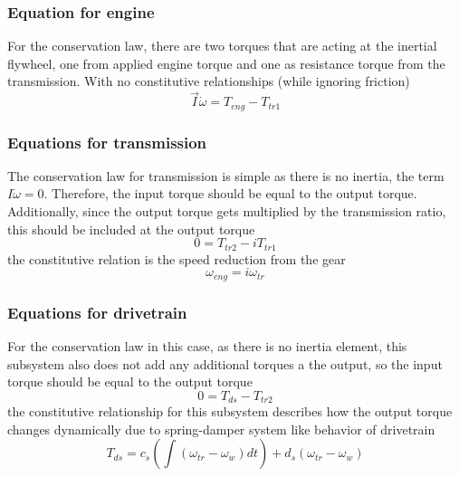 \subsubsection{Equation for engine}
For the conservation law, there are two torques that are acting at the inertial flywheel, one from applied engine torque and one as resistance torque from the transmission. With no constitutive relationships (while ignoring friction)
\begin{equation}
	\vec{I}\dot{\omega} = T_{eng} - T_{tr1}
\end{equation}

\subsubsection{Equations for transmission}

The conservation law for transmission is simple as there is no inertia, the term $I \dot{\omega} = 0$. Therefore, the input torque should be equal to the output torque. Additionally, since the output torque gets multiplied by the transmission ratio, this should be included at the output torque
\begin{equation} \label{Eq_random_21}
	0 = T_{tr2} - i T_{tr1}
\end{equation}
the constitutive relation is the speed reduction from the gear
\begin{equation} \label{Eq_random_24}
	\omega_{eng} = i \omega_{tr}
\end{equation}

\subsubsection{Equations for drivetrain}

For the conservation law in this case, as there is no inertia element, this subsystem also does not add any additional torques a the output, so the input torque should be equal to the output torque
\begin{equation} \label{Eq_random_22}
	0 = T_{ds} - T_{tr2}
\end{equation}
the constitutive relationship for this subsystem describes how the output torque changes dynamically due to spring-damper system like behavior of drivetrain
\begin{equation} \label{Eq_random_23}
	T_{ds} = c_s \left( \int (\omega_{tr} - \omega_{w}) dt \right) + d_s (\omega_{tr} - \omega_{w})
\end{equation}


